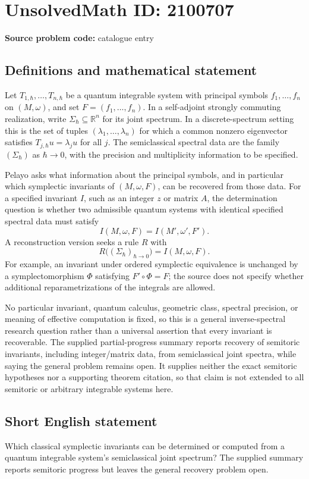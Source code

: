 \documentclass[11pt]{article}
\newcommand{\R}{\mathbb{R}}
\begin{document}
\section*{UnsolvedMath ID: 2100707}
\textbf{Source problem code:} catalogue entry
\subsection{Definitions and mathematical statement}
Let \(T_{1,\hbar},\ldots,T_{n,\hbar}\) be a quantum integrable system with principal symbols \(f_1,\ldots,f_n\) on \((M,\omega)\), and set \(F=(f_1,\ldots,f_n)\). In a self-adjoint strongly commuting realization, write \(\Sigma_\hbar\subseteq\R^n\) for its joint spectrum. In a discrete-spectrum setting this is the set of tuples \((\lambda_1,\ldots,\lambda_n)\) for which a common nonzero eigenvector satisfies \(T_{j,\hbar}u=\lambda_ju\) for all \(j\). The semiclassical spectral data are the family \((\Sigma_\hbar)\) as \(\hbar\to0\), with the precision and multiplicity information to be specified.

Pelayo asks what information about the principal symbols, and in particular which symplectic invariants of \((M,\omega,F)\), can be recovered from those data. For a specified invariant \(I\), such as an integer \(z\) or matrix \(A\), the determination question is whether two admissible quantum systems with identical specified spectral data must satisfy
\[
I(M,\omega,F)=I(M',\omega',F').
\]
A reconstruction version seeks a rule \(R\) with
\[
R\bigl((\Sigma_\hbar)_{\hbar\to0}\bigr)=I(M,\omega,F).
\]
For example, an invariant under ordered symplectic equivalence is unchanged by a symplectomorphism \(\Phi\) satisfying \(F'\circ\Phi=F\); the source does not specify whether additional reparametrizations of the integrals are allowed.

No particular invariant, quantum calculus, geometric class, spectral precision, or meaning of effective computation is fixed, so this is a general inverse-spectral research question rather than a universal assertion that every invariant is recoverable. The supplied partial-progress summary reports recovery of semitoric invariants, including integer/matrix data, from semiclassical joint spectra, while saying the general problem remains open. It supplies neither the exact semitoric hypotheses nor a supporting theorem citation, so that claim is not extended to all semitoric or arbitrary integrable systems here.
\subsection{Short English statement}
Which classical symplectic invariants can be determined or computed from a quantum integrable system's semiclassical joint spectrum? The supplied summary reports semitoric progress but leaves the general recovery problem open.
\end{document}
